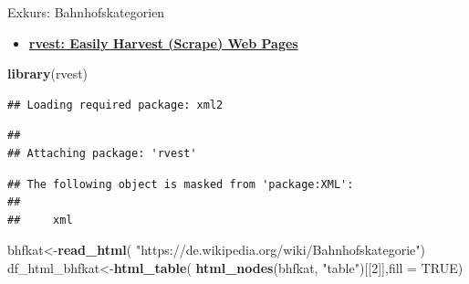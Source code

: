 \documentclass[ignorenonframetext,]{beamer}
\newenvironment{Shaded}{\begin{snugshade}}{\end{snugshade}}
\newcommand{\DataTypeTok}[1]{\textcolor[rgb]{0.13,0.29,0.53}{#1}}
\newcommand{\DecValTok}[1]{\textcolor[rgb]{0.00,0.00,0.81}{#1}}
\newcommand{\KeywordTok}[1]{\textcolor[rgb]{0.13,0.29,0.53}{\textbf{#1}}}
\newcommand{\NormalTok}[1]{#1}
\newcommand{\OtherTok}[1]{\textcolor[rgb]{0.56,0.35,0.01}{#1}}
\newcommand{\StringTok}[1]{\textcolor[rgb]{0.31,0.60,0.02}{#1}}
\providecommand{\tightlist}{%
  \setlength{\itemsep}{0pt}\setlength{\parskip}{0pt}}
\begin{document}
\begin{frame}[fragile]{Exkurs: Bahnhofskategorien}
\protect\hypertarget{exkurs-bahnhofskategorien}{}

\begin{itemize}
\tightlist
\item
  \href{https://cran.r-project.org/web/packages/rvest/index.html}{\textbf{rvest:
  Easily Harvest (Scrape) Web Pages}}
\end{itemize}

\begin{Shaded}
\begin{Highlighting}[]
\KeywordTok{library}\NormalTok{(rvest)}
\end{Highlighting}
\end{Shaded}

\begin{verbatim}
## Loading required package: xml2
\end{verbatim}

\begin{verbatim}
## 
## Attaching package: 'rvest'
\end{verbatim}

\begin{verbatim}
## The following object is masked from 'package:XML':
## 
##     xml
\end{verbatim}

\begin{Shaded}
\begin{Highlighting}[]
\NormalTok{bhfkat<-}\KeywordTok{read_html}\NormalTok{(}
  \StringTok{"https://de.wikipedia.org/wiki/Bahnhofskategorie"}\NormalTok{)}
\NormalTok{df_html_bhfkat<-}\KeywordTok{html_table}\NormalTok{(}
  \KeywordTok{html_nodes}\NormalTok{(bhfkat, }\StringTok{"table"}\NormalTok{)[[}\DecValTok{2}\NormalTok{]],}\DataTypeTok{fill =} \OtherTok{TRUE}\NormalTok{)}
\end{Highlighting}
\end{Shaded}

\end{frame}
\end{document}
